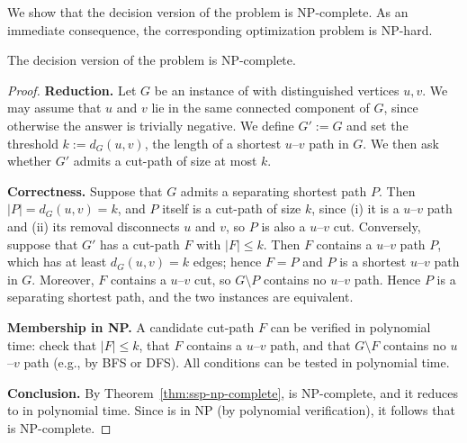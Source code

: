 We show that the decision version of the \MinCutPath{} problem is NP-complete.
As an immediate consequence, the corresponding optimization problem is NP-hard.

\begin{theorem}
\label{thm:mcp-np-complete}
The decision version of the \MinCutPath{} problem is NP-complete.
\end{theorem}

\begin{proof}
\textbf{Reduction.}
Let $G$ be an instance of \SSP{} with distinguished vertices $u,v$.
We may assume that $u$ and $v$ lie in the same connected component of $G$, since otherwise the answer is trivially negative.
We define $G' := G$ and set the threshold $k := d_G(u,v)$, the length of a shortest $u$--$v$ path in $G$.
We then ask whether $G'$ admits a cut-path of size at most $k$.

\textbf{Correctness.}
Suppose that $G$ admits a separating shortest path $P$.
Then $|P| = d_G(u,v) = k$, and $P$ itself is a cut-path of size $k$, since (i) it is a $u$--$v$ path and (ii) its removal disconnects $u$ and $v$, so $P$ is also a $u$--$v$ cut.
Conversely, suppose that $G'$ has a cut-path $F$ with $|F| \leq k$.
Then $F$ contains a $u$--$v$ path $P$, which has at least $d_G(u,v) = k$ edges; hence $F = P$ and $P$ is a shortest $u$--$v$ path in $G$.
Moreover, $F$ contains a $u$--$v$ cut, so $G \setminus P$ contains no $u$--$v$ path.
Hence $P$ is a separating shortest path, and the two instances are equivalent.

\textbf{Membership in NP.}
A candidate cut-path $F$ can be verified in polynomial time:
check that $|F| \leq k$, that $F$ contains a $u$--$v$ path, and that $G\setminus F$ contains no $u$--$v$ path (e.g., by BFS or DFS).
All conditions can be tested in polynomial time.

\textbf{Conclusion.}
By Theorem~\ref{thm:ssp-np-complete}, \SSP{} is NP-complete, and it reduces to \MinCutPath{} in polynomial time.
Since \MinCutPath{} is in NP (by polynomial verification), it follows that \MinCutPath{} is NP-complete.
\end{proof}

